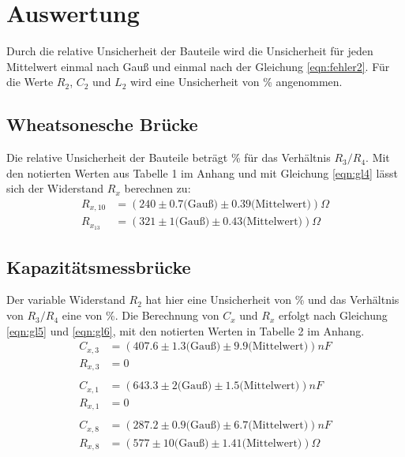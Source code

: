 \section{Auswertung}
\label{sec:Auswertung}

Durch die relative Unsicherheit der Bauteile wird die Unsicherheit für jeden Mittelwert einmal nach Gauß und einmal nach der Gleichung \eqref{eqn:fehler2}.
Für die Werte $R_2$, $C_2$ und $L_2$ wird eine Unsicherheit von \% angenommen.

\subsection{Wheatsonesche Brücke}
\label{sec:Weed}
Die relative Unsicherheit der Bauteile beträgt \% für das Verhältnis $R_3/R_4$.
Mit den notierten Werten aus Tabelle 1 im Anhang und mit Gleichung \eqref{eqn:gl4} lässt sich der Widerstand $R_x$ berechnen zu:
\begin{align}
  R_{x,10} &= (240 \pm 0.7 \textrm{(Gauß)} \pm 0.39 \textrm{(Mittelwert)}) \Omega \\
  R_{x_13} &= (321 \pm 1 \textrm{(Gauß)} \pm 0.43 \textrm{(Mittelwert)}) \Omega
\end{align}

\subsection{Kapazitätsmessbrücke}
\label{sec:Kapazitaet}
Der variable Widerstand $R_2$ hat hier eine Unsicherheit von \% und das Verhältnis von $R_3/R_4$ eine von \%.
Die Berechnung von $C_x$ und $R_x$ erfolgt nach Gleichung \eqref{eqn:gl5} und \eqref{eqn:gl6}, mit den notierten Werten in Tabelle 2 im Anhang.
\begin{align}
  C_{x,3} &= (407.6 \pm 1.3 \textrm{(Gauß)} \pm 9.9 \textrm{(Mittelwert)}) nF \\
  R_{x,3} &= 0\\
  \\
  C_{x,1} &= (643.3 \pm 2 \textrm{(Gauß)} \pm 1.5 \textrm{(Mittelwert)}) nF \\
  R_{x,1} &= 0\\
  \\
  C_{x,8} &= (287.2 \pm 0.9 \textrm{(Gauß)} \pm 6.7 \textrm{(Mittelwert)}) nF \\
  R_{x,8} &= (577 \pm 10 \textrm{(Gauß)} \pm 1.41 \textrm{(Mittelwert)}) \Omega
\end{align}

